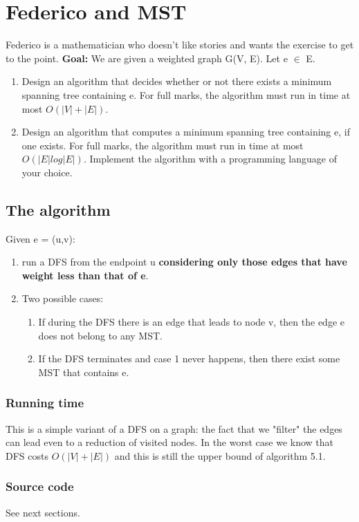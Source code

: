 \section{Federico and MST}
Federico is a mathematician who doesn't like stories and wants the exercise to get to the point.
\newline
\textbf{Goal:} We are given a weighted graph G(V, E). Let e $\in$ E.
\begin{enumerate}
	\item Design an algorithm that decides whether or not there exists a minimum spanning tree containing e. For full marks, the algorithm must run in time at most $O(|V | + |E|)$.
	\item Design an algorithm that computes a minimum spanning tree containing e, if one exists. For full marks, the algorithm must run in time at most $O(|E| log |E|)$. Implement the algorithm with a programming language of your choice.
\end{enumerate}

\subsection{The algorithm}
Given e = (u,v):
\begin{enumerate}
	\item run a DFS from the endpoint u \textbf{considering only those edges that have weight less than that of e}.
	\item Two possible cases:
	\begin{enumerate}
		\item If during the DFS there is an edge that leads to node v, then the edge e does not belong to any MST.
		\item If the DFS terminates and case 1 never happens, then there exist some MST that contains e.
	\end{enumerate}
\end{enumerate}

\subsubsection{Running time}
This is a simple variant of a DFS on a graph: the fact that we "filter" the edges can lead even to a reduction of visited nodes. In the worst case we know that DFS costs $O(|V| + |E|)$ and this is still the upper bound of algorithm 5.1.

\subsubsection{Source code}
See next sections.

